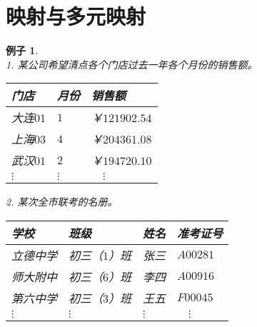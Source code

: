 \documentclass[12pt,UTF8]{ctexbook}
\newtheorem{ex}{例子}[section]
\begin{document}
\section{映射与多元映射}
\begin{ex}
    \mbox{}\\
    1. 某公司希望清点各个门店过去一年各个月份的销售额。
    \begin{center}
        \begin{tabular}{| p{4em}<{\centering} | p{2em}<{\centering} | p{6em}<{\centering} |}
            \hline
            门店 & 月份 & 销售额 \\ [0.5ex] 
            \hline
            大连$01$ & $1$ & ￥$121902.54$ \\  
            \hline
            上海$03$ & $4$ & ￥$204361.08$ \\  
            \hline
            武汉$01$ & $2$ & ￥$194720.10$ \\  
            \hline
            $\vdots$ & $\vdots$ & $\quad\vdots$ \\   
            \hline
        \end{tabular}
    \end{center}
    2. 某次全市联考的名册。
    \begin{center}
        \begin{tabular}{| p{4em}<{\centering} | p{6em}<{\centering} | p{3em}<{\centering} | p{4em}<{\centering} |}
            \hline
            学校 & 班级 & 姓名 & 准考证号 \\ [0.5ex] 
            \hline
            立德中学 & 初三（$1$）班 & 张三 & $A00281$ \\  
            \hline
            师大附中 & 初三（$6$）班 & 李四 & $A00916$ \\  
            \hline
            第六中学 & 初三（$3$）班 & 王五 & $F00045$ \\  
            \hline
            $\vdots$ & $\vdots$& $\vdots$ & $\quad\vdots$ \\   
            \hline
        \end{tabular}
    \end{center}
\end{ex}
\end{document}
